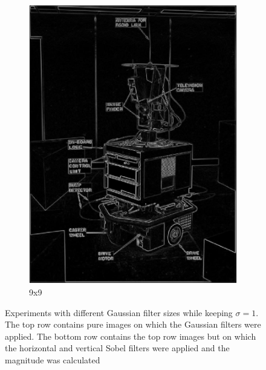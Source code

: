 \documentclass[lettersize,journal]{IEEEtran}
\begin{document}
\begin{figure}[h]
\begin{subfigure}[h]{0.115\textwidth}
        \includegraphics[width=\linewidth]{gaussian_edge_map_9x9_sigma_1}
        \caption{9x9}  
    \end{subfigure}
    \caption{Experiments with different Gaussian filter sizes while keeping $\sigma=1$. The top row contains pure images on which the Gaussian filters were applied. The bottom row contains the top row images but on which the horizontal and vertical Sobel filters were applied and the magnitude was calculated}
    \label{fig:3}
\end{figure}
\end{document}
